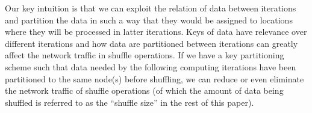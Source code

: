 \documentclass[10pt,journal,compsoc]{IEEEtran}
\newcommand{\blue}[1]{\textcolor{blue}{#1}}
\begin{document}

Our key %
intuition is that we can exploit the relation of data between
iterations and partition the data in such a way that they would be
assigned to locations where they will be processed in latter iterations.
Keys of data have relevance over different iterations 
and how data are partitioned between iterations
can greatly affect the network traffic in shuffle operations.
If we have a key partitioning scheme such that data needed by the
following computing iterations have been partitioned to the same 
node(s) before shuffling, we can reduce or even eliminate
the network traffic of shuffle operations (of which the amount of data
being shuffled is referred to as the
``shuffle size'' in the rest of this paper).
\end{document}
